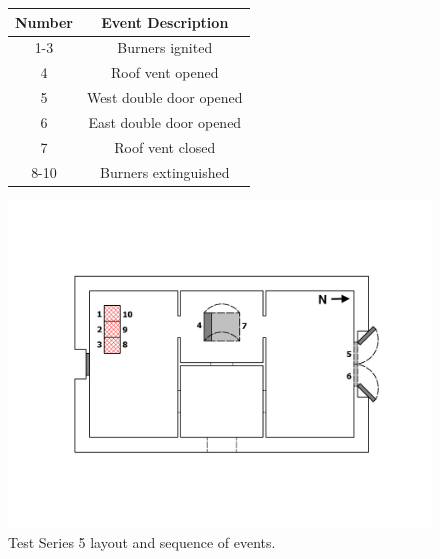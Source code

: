 \documentclass[12pt,oneside]{book}
\begin{document}
\begin{figure}[!ht]
\begin{minipage}[b]{0.8\columnwidth}
	\begin{flushleft}
	\small
	\begin{tabular}[b]{cc}
 	\toprule
 	\textbf{Number} & \textbf{Event Description} \\
 	\midrule
 	1-3  & Burners ignited \\
 	4	 & Roof vent opened \\
 	5 	 & West double door opened \\
 	6 	 & East double door opened \\	
 	7	 & Roof vent closed \\
 	8-10  & Burners extinguished \\
	\bottomrule
	\end{tabular}
	\end{flushleft}
\end{minipage}
\begin{minipage}[b]{0.9\columnwidth}
	\vspace{15pt}
	\centering
	\includegraphics[width=\columnwidth]{../Figures/Floor_Plans/East_Structure_Test_5}
\end{minipage}
\caption{Test Series 5 layout and sequence of events.}
\label{fig:east_test_5}
\end{figure}
\end{document}
